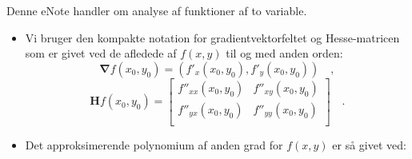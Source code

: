 \begin{summary}
Denne eNote handler om analyse af funktioner af to variable.
\begin{itemize}
\item Vi bruger den kompakte notation for gradientvektorfeltet og Hesse-matricen som er givet ved
de afledede af $f(x,y)$ til og med anden orden:
\begin{equation}
\bm{\nabla}f(x_{0}, y_{0}) = (f'_{x}(x_{0}, y_{0}), f'_{y}(x_{0}, y_{0})) \quad ,
\end{equation}
\begin{equation}
\mathbf{H}f(x_{0}, y_{0}) = \left[
                              \begin{array}{cc}
                                f''_{xx}(x_{0}, y_{0}) & f''_{xy}(x_{0}, y_{0}) \\
                                f''_{yx}(x_{0}, y_{0}) & f''_{yy}(x_{0}, y_{0}) \\
                              \end{array}
                            \right] \quad .
\end{equation}
\item Det approksimerende polynomium af anden grad for $f(x,y)$ er så givet ved:


\end{itemize}
\end{summary}

